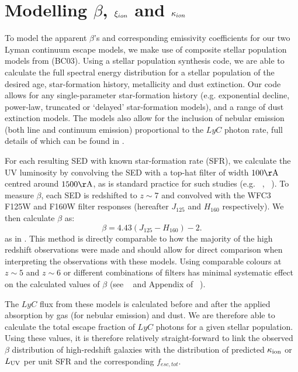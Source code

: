 \section{Modelling $\beta$, $\xi_{\lowercase{ion}}$ and $\kappa_{\lowercase{ion}}$} \label{sec:models}
To model the apparent $\beta$'s and corresponding emissivity coefficients for our two Lyman continuum escape models, we make use of composite stellar population models from \citet{Bruzual:2003ckb} (BC03). Using a stellar population synthesis code, we are able to calculate the full spectral energy distribution for a stellar population of the desired age, star-formation history, metallicity and dust extinction. Our code allows for any single-parameter star-formation history (e.g. exponential decline, power-law, truncated or `delayed' star-formation models), and a range of dust extinction models. The models also allow for the inclusion of nebular emission (both line and continuum emission) proportional to the $LyC$ photon rate, full details of which can be found in \citet{Duncan:2014gh}.

For each resulting SED with known star-formation rate (SFR), we calculate the UV luminosity by convolving the SED with a top-hat filter of width $100\rm{\AA}$ centred around $1500\rm{\AA}$, as is standard practice for such studies (e.g. \citeauthor{Finkelstein:2012hr}~\citeyear{Finkelstein:2012hr}, \citeauthor{McLure:2013hh}~\citeyear{McLure:2013hh}). To measure \(\beta \), each SED is redshifted to \(z \sim 7 \) and convolved with the WFC3 F125W and F160W filter responses (hereafter \(J_{125} \) and \(H_{160}\) respectively). We then calculate \( \beta \) as: 
\begin{equation}\label{eq:beta_calc}
    \beta = 4.43(J_{125} - H_{160}) - 2. 
\end{equation}
as in \citet{Dunlop:2013kp}. This method is directly comparable to how the majority of the high redshift observations were made and should allow for direct comparison when interpreting the observations with these models. Using comparable colours at $z\sim5$ and $z\sim6$ or different combinations of filters has minimal systematic effect on the calculated values of $\beta$ (see \citeauthor{Dunlop:2011jl}~\citeyear{Dunlop:2011jl} and Appendix of \citet{}\citeauthor{2012ApJ...754...83B}~\citeyear{2012ApJ...754...83B}).

The $LyC$ flux from these models is calculated before and after the applied absorption by gas (for nebular emission) and dust. We are therefore able to calculate the total escape fraction of $LyC$ photons for a given stellar population. Using these values, it is therefore relatively straight-forward to link the observed $\beta$ distribution of high-redshift galaxies with the distribution of predicted $\kappa_{\rm{ion}}$ or $L_{\rm{UV}}$ per unit SFR and the corresponding $f_{esc,tot}$.

